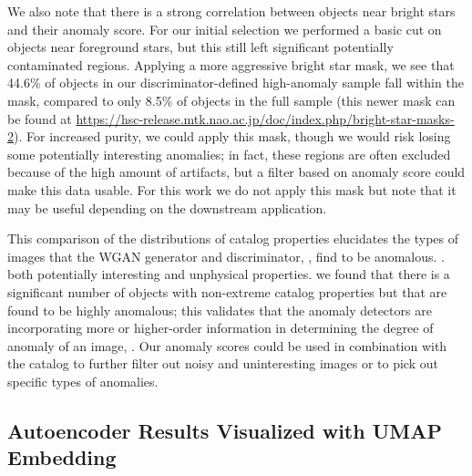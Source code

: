 We also note that there is a strong correlation between objects near bright stars and their anomaly score.
For our initial selection we performed a basic cut on objects near foreground stars, but this still left significant potentially contaminated regions.
Applying a more aggressive bright star mask, we see that 44.6\% of objects in our discriminator-defined high-anomaly sample fall within the mask, compared to only 8.5\% of objects in the full sample (this newer mask can be found at \url{https://hsc-release.mtk.nao.ac.jp/doc/index.php/bright-star-masks-2}).
For increased purity, we could apply this mask, though we would risk losing some potentially interesting anomalies; in fact, these regions are often excluded because of the high amount of artifacts, but a filter based on anomaly score could make this data usable.
For this work we do not apply this mask but note that it may be useful depending on the downstream application.

This comparison of the distributions of catalog properties elucidates the types of images that the WGAN generator and discriminator, , find to be anomalous. 
. 
 both potentially interesting and unphysical properties.
 we found that there is a significant number of objects with non-extreme catalog properties but that are found to be highly anomalous; this validates that the anomaly detectors are incorporating more or higher-order information in determining the degree of anomaly of an image, .
Our anomaly scores could be used in combination with the catalog to further filter out noisy and uninteresting images or to pick out specific types of anomalies.


\subsection{Autoencoder Results Visualized with UMAP Embedding}
\label{sec:cae-umap}

